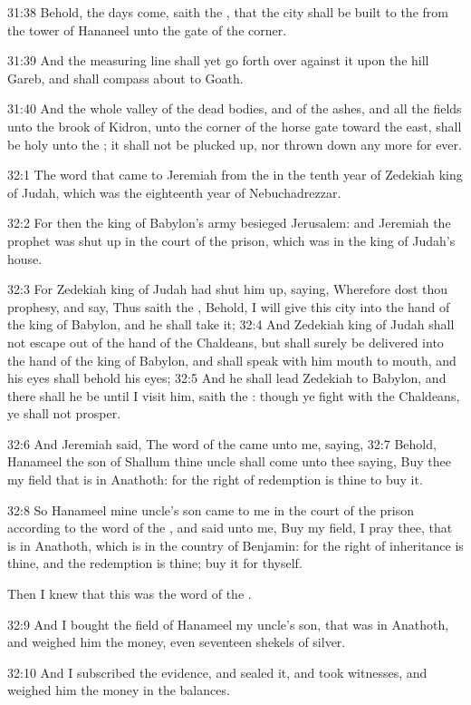 31:38 Behold, the days come, saith the \LORD, that the city shall be
built to the \LORD from the tower of Hananeel unto the gate of the
corner.

31:39 And the measuring line shall yet go forth over against it upon
the hill Gareb, and shall compass about to Goath.

31:40 And the whole valley of the dead bodies, and of the ashes, and
all the fields unto the brook of Kidron, unto the corner of the horse
gate toward the east, shall be holy unto the \LORD; it shall not be
plucked up, nor thrown down any more for ever.

32:1 The word that came to Jeremiah from the \LORD in the tenth year of
Zedekiah king of Judah, which was the eighteenth year of
Nebuchadrezzar.

32:2 For then the king of Babylon's army besieged Jerusalem: and
Jeremiah the prophet was shut up in the court of the prison, which was
in the king of Judah's house.

32:3 For Zedekiah king of Judah had shut him up, saying, Wherefore
dost thou prophesy, and say, Thus saith the \LORD, Behold, I will give
this city into the hand of the king of Babylon, and he shall take it;
32:4 And Zedekiah king of Judah shall not escape out of the hand of
the Chaldeans, but shall surely be delivered into the hand of the king
of Babylon, and shall speak with him mouth to mouth, and his eyes
shall behold his eyes; 32:5 And he shall lead Zedekiah to Babylon, and
there shall he be until I visit him, saith the \LORD: though ye fight
with the Chaldeans, ye shall not prosper.

32:6 And Jeremiah said, The word of the \LORD came unto me, saying,
32:7 Behold, Hanameel the son of Shallum thine uncle shall come unto
thee saying, Buy thee my field that is in Anathoth: for the right of
redemption is thine to buy it.

32:8 So Hanameel mine uncle's son came to me in the court of the
prison according to the word of the \LORD, and said unto me, Buy my
field, I pray thee, that is in Anathoth, which is in the country of
Benjamin: for the right of inheritance is thine, and the redemption is
thine; buy it for thyself.

Then I knew that this was the word of the \LORD.

32:9 And I bought the field of Hanameel my uncle's son, that was in
Anathoth, and weighed him the money, even seventeen shekels of silver.

32:10 And I subscribed the evidence, and sealed it, and took
witnesses, and weighed him the money in the balances.


